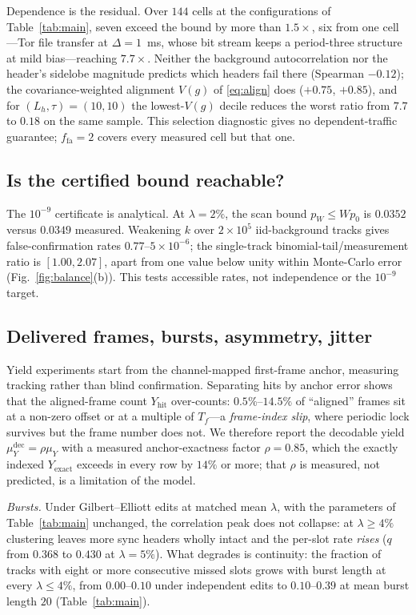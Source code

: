 \documentclass[journal]{IEEEtran}
\newcommand{\Tf}{T_f}
\newcommand{\muY}{\mu_Y}
\newcommand{\Lh}{L_h}
\begin{document}
Dependence is the residual. Over $144$ cells at the configurations of Table~\ref{tab:main}, seven exceed the bound by more than $1.5\times$, six from one cell---Tor file transfer at $\Delta=1$~ms, whose bit stream keeps a period-three structure at mild bias---reaching $7.7\times$. Neither the background autocorrelation nor the header's sidelobe magnitude predicts which headers fail there (Spearman $-0.12$); the covariance-weighted alignment $V(g)$ of \eqref{eq:align} does ($+0.75$, $+0.85$), and for $(\Lh,\tau)=(10,10)$ the lowest-$V(g)$ decile reduces the worst ratio from $7.7$ to $0.18$ on the same sample. This selection diagnostic gives no dependent-traffic guarantee; $f_{\mathrm{fa}}=2$ covers every measured cell but that one.

\subsection{Is the certified bound reachable?}
The $10^{-9}$ certificate is analytical. At $\lambda=2\%$, the scan bound $p_W\le Wp_0$ is $0.0352$ versus $0.0349$ measured. Weakening $k$ over $2\times10^5$ iid-background tracks gives false-confirmation rates $0.77$--$5\times10^{-6}$; the single-track binomial-tail/measurement ratio is $[1.00,2.07]$, apart from one value below unity within Monte-Carlo error (Fig.~\ref{fig:balance}(b)). This tests accessible rates, not independence or the $10^{-9}$ target.

\subsection{Delivered frames, bursts, asymmetry, jitter}
Yield experiments start from the channel-mapped first-frame anchor, measuring tracking rather than blind confirmation. Separating hits by anchor error shows that the aligned-frame count $Y_{\mathrm{hit}}$ over-counts: $0.5\%$--$14.5\%$ of ``aligned'' frames sit at a non-zero offset or at a multiple of $\Tf$---a \emph{frame-index slip}, where periodic lock survives but the frame number does not. We therefore report the decodable yield $\muY^{\mathrm{dec}}=\rho\muY$ with a measured anchor-exactness factor $\rho=0.85$, which the exactly indexed $Y_{\mathrm{exact}}$ exceeds in every row by $14\%$ or more; that $\rho$ is measured, not predicted, is a limitation of the model.

\emph{Bursts.} Under Gilbert--Elliott edits at matched mean $\lambda$, with the parameters of Table~\ref{tab:main} unchanged, the correlation peak does not collapse: at $\lambda\ge4\%$ clustering leaves more sync headers wholly intact and the per-slot rate \emph{rises} ($q$ from $0.368$ to $0.430$ at $\lambda=5\%$). What degrades is continuity: the fraction of tracks with eight or more consecutive missed slots grows with burst length at every $\lambda\le4\%$, from $0.00$--$0.10$ under independent edits to $0.10$--$0.39$ at mean burst length $20$ (Table~\ref{tab:main}).
\end{document}
